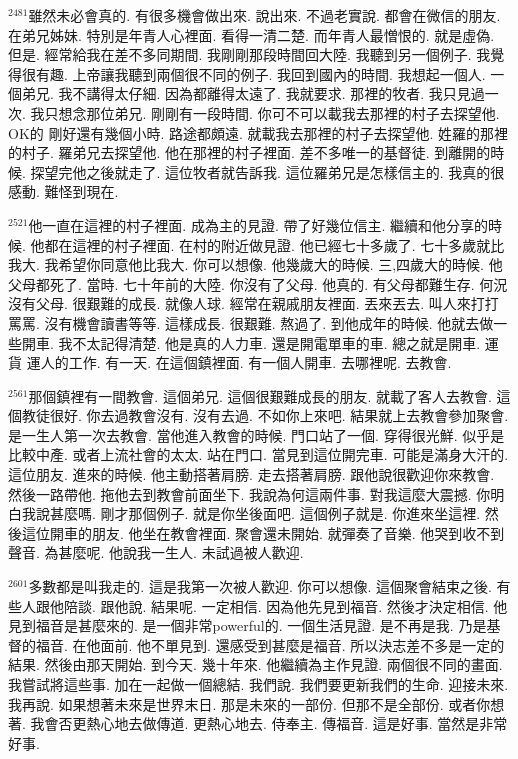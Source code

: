 \documentclass{book}
\begin{document}
$^{2481}$雖然未必會真的.
有很多機會做出來.
說出來.
不過老實說.
都會在微信的朋友.
在弟兄姊妹.
特別是年青人心裡面.
看得一清二楚.
而年青人最憎恨的.
就是虛偽.
但是.
經常給我在差不多同期間.
我剛剛那段時間回大陸.
我聽到另一個例子.
我覺得很有趣.
上帝讓我聽到兩個很不同的例子.
我回到國內的時間.
我想起一個人.
一個弟兄.
我不講得太仔細.
因為都離得太遠了.
我就要求.
那裡的牧者.
我只見過一次.
我只想念那位弟兄.
剛剛有一段時間.
你可不可以載我去那裡的村子去探望他.
OK的 剛好還有幾個小時.
路途都頗遠.
就載我去那裡的村子去探望他.
姓羅的那裡的村子.
羅弟兄去探望他.
他在那裡的村子裡面.
差不多唯一的基督徒.
到離開的時候.
探望完他之後就走了.
這位牧者就告訴我.
這位羅弟兄是怎樣信主的.
我真的很感動.
難怪到現在.

$^{2521}$他一直在這裡的村子裡面.
成為主的見證.
帶了好幾位信主.
繼續和他分享的時候.
他都在這裡的村子裡面.
在村的附近做見證.
他已經七十多歲了.
七十多歲就比我大.
我希望你同意他比我大.
你可以想像.
他幾歲大的時候.
三,四歲大的時候.
他父母都死了.
當時.
七十年前的大陸.
你沒有了父母.
他真的.
有父母都難生存.
何況沒有父母.
很艱難的成長.
就像人球.
經常在親戚朋友裡面.
丟來丟去.
叫人來打打罵罵.
沒有機會讀書等等.
這樣成長.
很艱難.
熬過了.
到他成年的時候.
他就去做一些開車.
我不太記得清楚.
他是真的人力車.
還是開電單車的車.
總之就是開車.
運貨 運人的工作.
有一天.
在這個鎮裡面.
有一個人開車.
去哪裡呢.
去教會.

$^{2561}$那個鎮裡有一間教會.
這個弟兄.
這個很艱難成長的朋友.
就載了客人去教會.
這個教徒很好.
你去過教會沒有.
沒有去過.
不如你上來吧.
結果就上去教會參加聚會.
是一生人第一次去教會.
當他進入教會的時候.
門口站了一個.
穿得很光鮮.
似乎是比較中產.
或者上流社會的太太.
站在門口.
當見到這位開完車.
可能是滿身大汗的.
這位朋友.
進來的時候.
他主動搭著肩膀.
走去搭著肩膀.
跟他說很歡迎你來教會.
然後一路帶他.
拖他去到教會前面坐下.
我說為何這兩件事.
對我這麼大震撼.
你明白我說甚麼嗎.
剛才那個例子.
就是你坐後面吧.
這個例子就是.
你進來坐這裡.
然後這位開車的朋友.
他坐在教會裡面.
聚會還未開始.
就彈奏了音樂.
他哭到收不到聲音.
為甚麼呢.
他說我一生人.
未試過被人歡迎.

$^{2601}$多數都是叫我走的.
這是我第一次被人歡迎.
你可以想像.
這個聚會結束之後.
有些人跟他陪談.
跟他說.
結果呢.
一定相信.
因為他先見到福音.
然後才決定相信.
他見到福音是甚麼來的.
是一個非常powerful的.
一個生活見證.
是不再是我.
乃是基督的福音.
在他面前.
他不單見到.
還感受到甚麼是福音.
所以決志差不多是一定的結果.
然後由那天開始.
到今天.
幾十年來.
他繼續為主作見證.
兩個很不同的畫面.
我嘗試將這些事.
加在一起做一個總結.
我們說.
我們要更新我們的生命.
迎接未來.
我再說.
如果想著未來是世界末日.
那是未來的一部份.
但那不是全部份.
或者你想著.
我會否更熱心地去做傳道.
更熱心地去.
侍奉主.
傳福音.
這是好事.
當然是非常好事.
\end{document}
